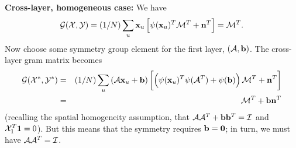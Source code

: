 {\bf Cross-layer, homogeneous case:} We have
\[
{\cal G}({\cal {X}}, {\cal {Y}})=(1/N)\sum_u {\bf {x}}_u\left[
  \psi({\bf {x}}_u)^T{\cal {M}}^T+{\bf {n}}^T\right]={\cal {M}}^T.\]
Now choose some symmetry group element for the first layer,
$\left({\cal {A}}, {\bf {b}}\right)$.  The cross-layer gram matrix
becomes 
\begin{eqnarray*}
{\cal G}({\cal {X}}^*, {\cal {Y}}^*)&=&(1/N)\sum_u \left({\cal {A}} {\bf {x}}_u+{\bf {b}}\right)\left[\left(\psi({\bf {x}}_u)^T\psi({\cal {A}}^T)+\psi({\bf {b}})\right){\cal {M}}^T+{\bf {n}}^T\right]\\
&=&{\cal {M}}^T+{\bf {b}}{\bf {n}}^T
\end{eqnarray*}
(recalling the spatial homogeneity assumption, that ${\cal {A}}{\cal {A}}^T+{\bf {b}}{\bf {b}}^T={\cal {I}}$ and
${\cal {X}}_1^T{\bf {1}}=0$).  But this means that the symmetry requires
${\bf {b}}={\bf {0}}$; in turn, we must have
${\cal {A}}{\cal {A}}^T={\cal {I}}$.
